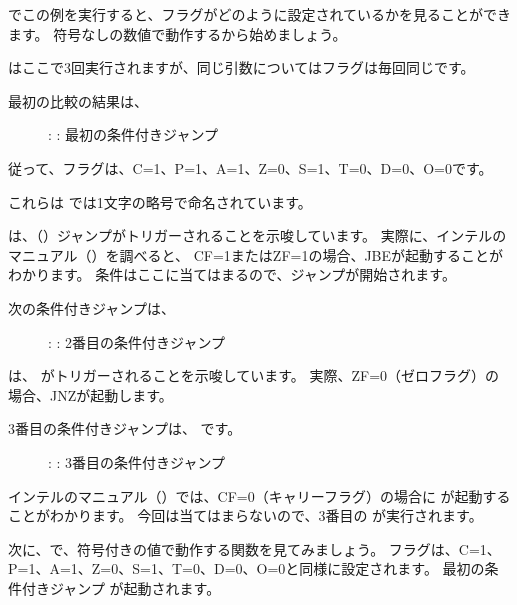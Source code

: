\clearpage
{}
\myindex{\olly}

\olly でこの例を実行すると、フラグがどのように設定されているかを見ることができます。 
符号なしの数値で動作するから始めましょう。

\CMP はここで3回実行されますが、同じ引数についてはフラグは毎回同じです。

最初の比較の結果は、

\begin{figure}[H]
\centering
{}
\caption{\olly: : 最初の条件付きジャンプ}
\label{fig:jcc_olly_unsigned_1}
\end{figure}

従って、フラグは、C=1、P=1、A=1、Z=0、S=1、T=0、D=0、O=0です。

これらは \olly では1文字の略号で命名されています。

\olly は、（\JBE）ジャンプがトリガーされることを示唆しています。 
実際に、インテルのマニュアル（）を調べると、
CF=1またはZF=1の場合、JBEが起動することがわかります。 
条件はここに当てはまるので、ジャンプが開始されます。

\clearpage
次の条件付きジャンプは、

\begin{figure}[H]
\centering
{}
\caption{\olly: : 2番目の条件付きジャンプ}
\label{fig:jcc_olly_unsigned_2}
\end{figure}

\olly は、 \JNZ がトリガーされることを示唆しています。 
実際、ZF=0（ゼロフラグ）の場合、JNZが起動します。

\clearpage
3番目の条件付きジャンプは、 \JNB です。

\begin{figure}[H]
\centering
{}
\caption{\olly: : 3番目の条件付きジャンプ}
\label{fig:jcc_olly_unsigned_3}
\end{figure}

インテルのマニュアル（）では、CF=0（キャリーフラグ）の場合に \JNB が起動することがわかります。 
今回は当てはまらないので、3番目の \printf が実行されます。

\clearpage
次に、\olly で、符号付きの値で動作する関数を見てみましょう。 
フラグは、C=1、P=1、A=1、Z=0、S=1、T=0、D=0、O=0と同様に設定されます。 
最初の条件付きジャンプ \JLE が起動されます。

